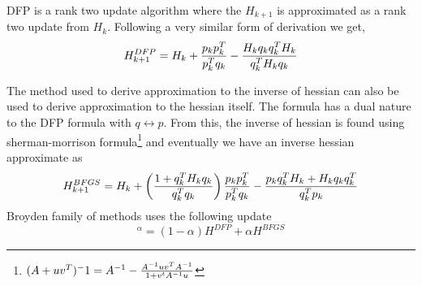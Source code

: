 \begin{slide}
DFP is a rank two update algorithm where the $H_{k+1}$ is approximated as a rank two update from $H_k$. Following a very similar form of derivation we get,
$$H^{DFP}_{k+1} = H_k + {p_kp_k^T\over p_k^Tq_k} -{H_kq_kq_k^TH_k \over q_k^TH_kq_k}$$

The method used to derive approximation to the inverse of hessian can also be used to derive approximation to the hessian itself. The formula has a dual nature to the DFP formula with $q\longleftrightarrow p$. From this, the inverse of hessian is found using sherman-morrison formula\footnote{$(A+uv^T)^-1 = A^{-1} -{A^{-1}uv^TA^{-1}\over 1+v^tA^{-1}u}$}  and eventually we have an inverse hessian approximate as
$$H^{BFGS}_{k+1} = H_k 
				+ \left({1+q_k^TH_kq_k\over q_k^Tq_k}\right){p_kp_k^T\over p_k^Tq_k}
				-{p_kq_k^TH_k+H_kq_kq_k^T \over q_k^Tp_k}$$
Broyden family of methods uses the following update
$$^\alpha  = (1-\alpha) H^{DFP} + \alpha H^{BFGS}$$
\end{slide}

